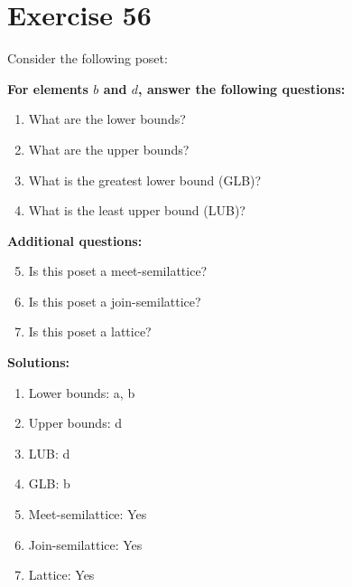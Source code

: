 \documentclass{article}
\begin{document}
\section*{Exercise 56}
Consider the following poset:
\begin{center}
\end{center}

    \textbf{For elements $b$ and $d$, answer the following questions:}
\begin{enumerate}
    \item What are the lower bounds?
    \item What are the upper bounds?
    \item What is the greatest lower bound (GLB)?
    \item What is the least upper bound (LUB)?
\end{enumerate}
    \hspace*{3ex} \textbf{Additional questions:}
\begin{enumerate}
    \setcounter{enumi}{4}
    \item Is this poset a meet-semilattice?
    \item Is this poset a join-semilattice?
    \item Is this poset a lattice?
\end{enumerate}

\textbf{Solutions:}
\begin{enumerate}
    \item Lower bounds: {a, b}
    \item Upper bounds: {d}
    \item LUB: d
    \item GLB: b
    \item Meet-semilattice: Yes
    \item Join-semilattice: Yes
    \item Lattice: Yes
\end{enumerate}
\newpage
\end{document}
